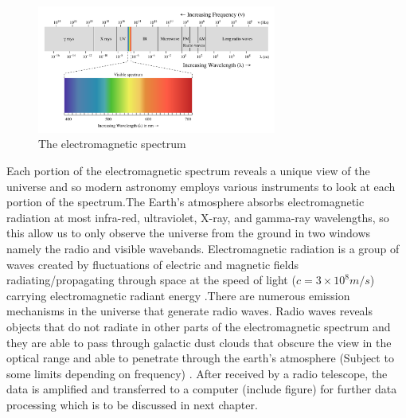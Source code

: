 \begin{figure}[h!]
  \centering
    \includegraphics[width=0.7\textwidth]{images/Electromagnetic-Spectrum.png}
    \caption{The electromagnetic spectrum}
  \label{images/Electromagnetic-Spectrum.png}
\end{figure}

Each portion of the electromagnetic spectrum reveals a unique view of the universe and so modern astronomy employs various instruments to look at each portion of the spectrum.\;The Earth's atmosphere absorbs electromagnetic radiation at most infra-red, ultraviolet, X-ray, and gamma-ray wavelengths, so this allow us to only observe the universe from the ground in two windows namely the radio and visible wavebands. Electromagnetic radiation is a group of waves created by fluctuations of electric and magnetic fields radiating/propagating through space at the speed of light ($c=3\times 10^{8} m/s$) carrying electromagnetic radiant energy \citep{staats2016genetic}.\;There are numerous emission mechanisms in the universe that generate radio waves. Radio waves reveals objects that do not radiate in other parts of the electromagnetic spectrum and they are able to pass through galactic dust clouds that obscure the view in the optical range and able to penetrate through the earth's atmosphere (Subject to some limits depending on frequency) \citep{thompson2001interferometry}. After received by a radio telescope, the data is amplified and transferred to a computer (include figure) for further  data processing which is to be discussed in next chapter.


